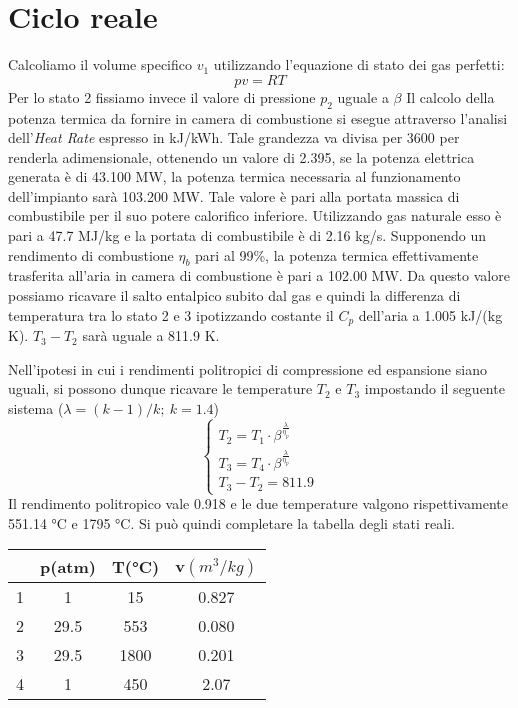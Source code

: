 \documentclass[a4paper,12pt]{article}
\begin{document}
\section{Ciclo reale}
\label{sec:ciclo_reale}
Calcoliamo il volume specifico $v_1$ utilizzando l'equazione di stato dei gas perfetti:
\begin{equation}
    \label{eq:gas_perfetti}
    pv = RT
\end{equation}
Per lo stato 2 fissiamo invece il valore di pressione $p_2$ uguale a $\beta$
Il calcolo della potenza termica da fornire in camera di combustione si esegue attraverso l'analisi dell'\textit{Heat Rate} espresso in kJ/kWh.
Tale grandezza va divisa per 3600 per renderla adimensionale, ottenendo un valore di 2.395, se la potenza elettrica generata è di 43.100 MW, 
la potenza termica necessaria al funzionamento dell'impianto sarà 103.200 MW.
Tale valore è pari alla portata massica di combustibile per il suo potere calorifico inferiore. Utilizzando gas naturale esso è pari a 47.7 MJ/kg e la portata di combustibile
è di 2.16 kg/s.
Supponendo un rendimento di combustione $\eta_b$ pari al 99\%, la potenza termica effettivamente trasferita all'aria in camera di combustione è pari a
102.00 MW. Da questo valore possiamo ricavare il salto entalpico subito dal gas e quindi la differenza di temperatura tra lo stato 2 e 3 ipotizzando costante il $C_p$
dell'aria a 1.005 kJ/(kg K).
$T_3 -T_2$ sarà uguale a 811.9 K.

Nell'ipotesi in cui i rendimenti politropici di compressione ed espansione siano uguali, si possono dunque ricavare le temperature $T_2$ e $T_3$ impostando il seguente sistema
($\lambda = (k-1)/k;\ k=1.4$)
$$
\begin{cases}
    T_2 = T_1\cdot\beta^{\frac{\lambda}{\eta_p}} \\
    T_3 = T_4\cdot\beta^{\frac{\lambda}{\eta_p}}\\
    T_3-T_2 = 811.9
\end{cases}
$$
Il rendimento politropico vale 0.918 e le due temperature valgono rispettivamente 551.14 °C e 1795 °C.
Si può quindi completare la tabella degli stati reali.
\begin{center}
    \begin{tabular}{c|c|c|c}
            &p(atm) &T(°C)  &v$(m^3/kg)$     \\ \hline
        1   &    1  & 15    & 0.827   \\
        2   &   29.5&553    & 0.080   \\
        3   &   29.5&1800   & 0.201   \\
        4   &   1   & 450   & 2.07
    \end{tabular}
\end{center}
\end{document}
